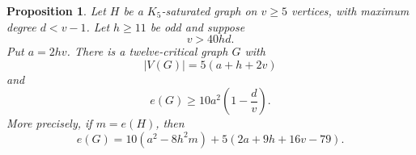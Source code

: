 \documentclass[11pt]{article}
\newtheorem{proposition}[theorem]{Proposition}
\numberwithin{equation}{section}
\begin{document}
\begin{proposition}\label{prop:conversion}
Let \(H\) be a \(K_5\)-saturated graph on \(v\ge5\) vertices,
with maximum degree \(d<v-1\). Let \(h\ge11\) be odd and suppose
\begin{equation}\label{eq:degree-condition}
 v>40hd.
\end{equation}
Put \(a=2hv\). There is a twelve-critical graph \(G\) with
\begin{equation}\label{eq:order}
 |V(G)|=5(a+h+2v)
\end{equation}
and
\begin{equation}\label{eq:edge-bound}
 e(G)\ge10a^2\left(1-\frac d v\right).
\end{equation}
More precisely, if \(m=e(H)\), then
\begin{equation}\label{eq:exact-edges}
 e(G)=10(a^2-8h^2m)+5(2a+9h+16v-79).
\end{equation}
\end{proposition}
\end{document}

